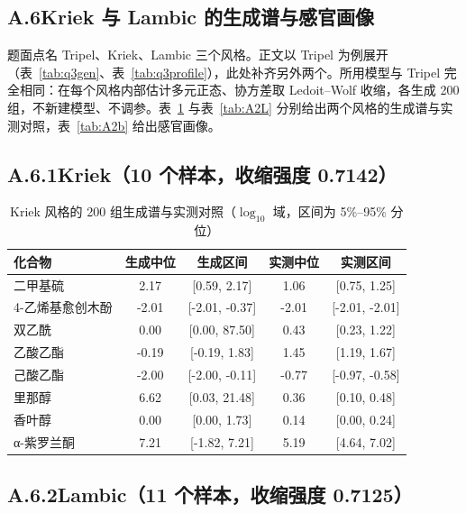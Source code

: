 \subsection*{A.6\quad Kriek 与 Lambic 的生成谱与感官画像}

题面点名 Tripel、Kriek、Lambic 三个风格。正文以 Tripel 为例展开（表~\ref{tab:q3gen}、表~\ref{tab:q3profile}），此处补齐另外两个。所用模型与 Tripel 完全相同：在每个风格内部估计多元正态、协方差取 Ledoit--Wolf 收缩，各生成 200 组，不新建模型、不调参。表~\ref{tab:A2K} 与表~\ref{tab:A2L} 分别给出两个风格的生成谱与实测对照，表~\ref{tab:A2b} 给出感官画像。

\subsection*{A.6.1\quad Kriek（10 个样本，收缩强度 0.7142）}

\begin{table}[H]
\centering
\footnotesize
\caption{Kriek 风格的 200 组生成谱与实测对照（$\log_{10}$ 域，区间为 5\%--95\% 分位）}
\label{tab:A2K}
\begin{tabular*}{\textwidth}{@{\extracolsep{\fill}}p{3.4cm}cccc@{}}
\toprule
\textbf{化合物} & \textbf{生成中位} & \textbf{生成区间} & \textbf{实测中位} & \textbf{实测区间} \\
\midrule
二甲基硫 & 2.17 & [0.59, 2.17] & 1.06 & [0.75, 1.25] \\
4-乙烯基愈创木酚 & -2.01 & [-2.01, -0.37] & -2.01 & [-2.01, -2.01] \\
双乙酰 & 0.00 & [0.00, 87.50] & 0.43 & [0.23, 1.22] \\
乙酸乙酯 & -0.19 & [-0.19, 1.83] & 1.45 & [1.19, 1.67] \\
己酸乙酯 & -2.00 & [-2.00, -0.11] & -0.77 & [-0.97, -0.58] \\
里那醇 & 6.62 & [0.03, 21.48] & 0.36 & [0.10, 0.48] \\
香叶醇 & 0.00 & [0.00, 1.73] & 0.14 & [0.00, 0.24] \\
α-紫罗兰酮 & 7.21 & [-1.82, 7.21] & 5.19 & [4.64, 7.02] \\
\bottomrule
\end{tabular*}
\end{table}

\subsection*{A.6.2\quad Lambic（11 个样本，收缩强度 0.7125）}

